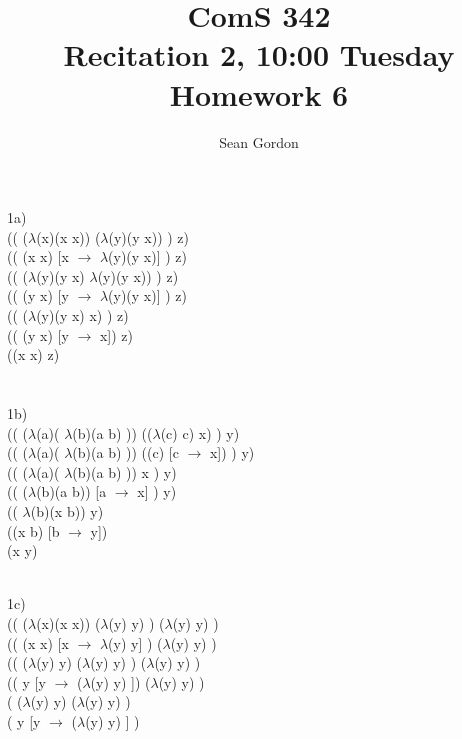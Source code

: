 \documentclass[12pt]{article}
\title{ComS 342\\Recitation 2, 10:00 Tuesday\\Homework 6}
\author{Sean Gordon}
\begin{document}
\maketitle


\noindent 1a)\\
(( ($\lambda$(x)(x x)) ($\lambda$(y)(y x)) ) z)\\
(( (x x) [x $\to$ $\lambda$(y)(y x)] ) z)\\

\noindent (( ($\lambda$(y)(y x) $\lambda$(y)(y x)) ) z)\\
(( (y x) [y $\to$ $\lambda$(y)(y x)] ) z)\\

\noindent (( ($\lambda$(y)(y x) x) ) z)\\
(( (y x) [y $\to$ x]) z)\\

\noindent ((x x) z)\\\\\\


\noindent 1b)\\
(( ($\lambda$(a)( $\lambda$(b)(a b) )) (($\lambda$(c) c) x) ) y)\\
(( ($\lambda$(a)( $\lambda$(b)(a b) )) ((c) [c $\to$ x]) ) y)\\

\noindent (( ($\lambda$(a)( $\lambda$(b)(a b) )) x ) y)\\
(( ($\lambda$(b)(a b)) [a $\to$ x] ) y)\\

\noindent (( $\lambda$(b)(x b)) y)\\
((x b) [b $\to$ y])\\
\noindent (x y)\\\\

\pagebreak

\noindent 1c)\\
(( ($\lambda$(x)(x x)) ($\lambda$(y) y) ) ($\lambda$(y) y) )\\
(( (x x) [x $\to$ $\lambda$(y) y] ) ($\lambda$(y) y) )\\

\noindent(( ($\lambda$(y) y) ($\lambda$(y) y) ) ($\lambda$(y) y) )\\
(( y [y $\to$ ($\lambda$(y) y) ]) ($\lambda$(y) y) )\\

\noindent( ($\lambda$(y) y) ($\lambda$(y) y) )\\
( y [y $\to$ ($\lambda$(y) y) ] )\\
\end{document}
